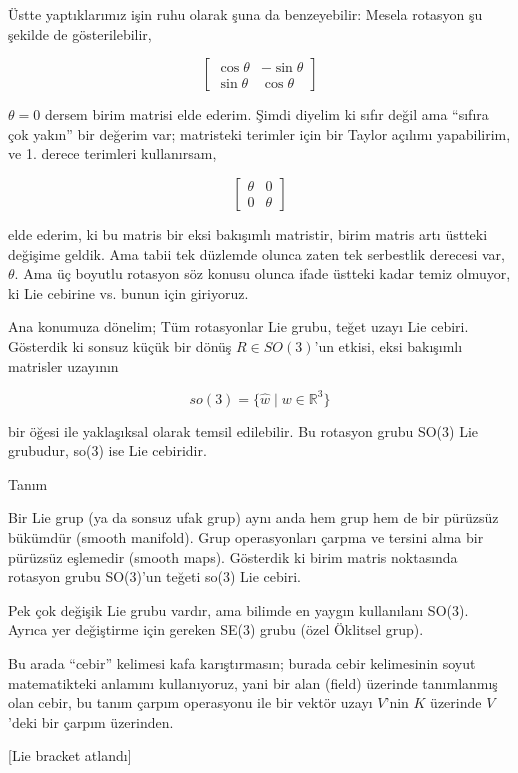 \documentclass[12pt,fleqn]{article}\usepackage{../../common}
\begin{document}
Üstte yaptıklarımız işin ruhu olarak şuna da benzeyebilir: Mesela rotasyon
şu şekilde de gösterilebilir,

$$ 
\left[\begin{array}{rrr}
\cos \theta & -\sin \theta \\
\sin \theta & \cos \theta 
\end{array}\right]
 $$

$\theta=0$ dersem birim matrisi elde ederim. Şimdi diyelim ki sıfır değil
ama ``sıfıra çok yakın'' bir değerim var; matristeki terimler için bir
Taylor açılımı yapabilirim, ve 1. derece terimleri kullanırsam,

$$ 
\left[\begin{array}{rr}
\theta & 0 \\ 0 & \theta 
\end{array}\right]
 $$

elde ederim, ki bu matris bir eksi bakışımlı matristir, birim matris artı
üstteki değişime geldik. Ama tabii tek düzlemde olunca zaten tek serbestlik
derecesi var, $\theta$. Ama üç boyutlu rotasyon söz konusu olunca ifade
üstteki kadar temiz olmuyor, ki Lie cebirine vs. bunun için giriyoruz. 

Ana konumuza dönelim; Tüm rotasyonlar Lie grubu, teğet uzayı Lie
cebiri. Gösterdik ki sonsuz küçük bir dönüş $R \in SO(3)$'un etkisi, eksi
bakışımlı matrisler uzayının

$$ so(3) = \{ \hat{w} \mid  w \in  \mathbb{R}^3\} $$

bir öğesi ile yaklaşıksal olarak temsil edilebilir. Bu rotasyon grubu SO(3)
Lie grubudur, so(3) ise Lie cebiridir. 

Tanım

Bir Lie grup (ya da sonsuz ufak grup) aynı anda hem grup hem de bir pürüzsüz
bükümdür (smooth manifold). Grup operasyonları çarpma ve tersini alma bir
pürüzsüz eşlemedir (smooth maps). Gösterdik ki birim matris noktasında rotasyon
grubu SO(3)'un teğeti so(3) Lie cebiri.

Pek çok değişik Lie grubu vardır, ama bilimde en yaygın kullanılanı
SO(3). Ayrıca yer değiştirme için gereken SE(3) grubu (özel Öklitsel grup).

Bu arada ``cebir'' kelimesi kafa karıştırmasın; burada cebir kelimesinin
soyut matematikteki anlamını kullanıyoruz, yani bir alan (field) üzerinde
tanımlanmış olan cebir, bu tanım çarpım operasyonu ile bir vektör uzayı
$V$'nin $K$ üzerinde $V$'deki bir çarpım üzerinden.

[Lie bracket atlandı]
\end{document}
